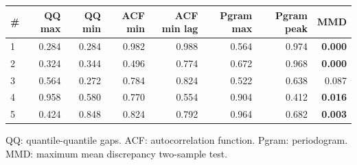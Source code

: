 \documentclass[11pt,a4paper]{article}
\begin{document}
\begin{center}
\begin{tabular}{lrrrrrrr}
\toprule
\# & QQ max & QQ min & ACF min & ACF min lag & Pgram max & Pgram peak & MMD \\
\midrule
1 & 0.284 & 0.284 & 0.982 & 0.988 & 0.564 & 0.974 & \textbf{0.000} \\
2 & 0.324 & 0.344 & 0.496 & 0.774 & 0.672 & 0.968 & \textbf{0.000} \\
3 & 0.564 & 0.272 & 0.784 & 0.824 & 0.522 & 0.638 & 0.087 \\
4 & 0.958 & 0.580 & 0.770 & 0.554 & 0.904 & 0.412 & \textbf{0.016} \\
5 & 0.424 & 0.848 & 0.824 & 0.792 & 0.964 & 0.682 & \textbf{0.003} \\
\bottomrule
\end{tabular}
\end{center}

QQ: quantile-quantile gaps. ACF: autocorrelation function. Pgram: periodogram. MMD: maximum mean discrepancy two-sample test.
\end{document}
